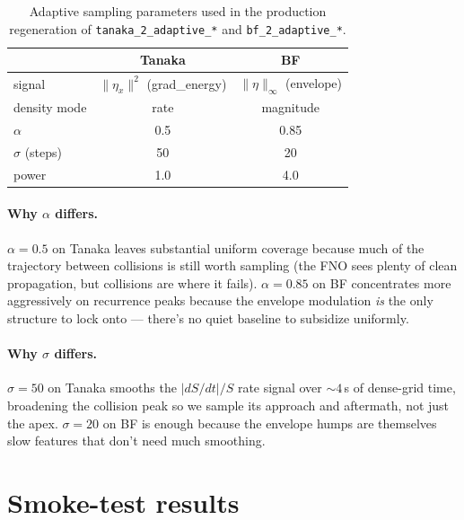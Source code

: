 \documentclass[11pt]{article}
\begin{document}
\begin{table}[h]
\centering
\begin{tabular}{lcc}
\toprule
                  & Tanaka                      & BF                          \\
\midrule
signal            & $\|\eta_x\|^2$ (grad\_energy) & $\|\eta\|_{\infty}$ (envelope) \\
density mode      & rate                        & magnitude                   \\
$\alpha$          & 0.5                         & 0.85                        \\
$\sigma$ (steps)  & 50                          & 20                          \\
power             & 1.0                         & 4.0                         \\
\bottomrule
\end{tabular}
\caption{Adaptive sampling parameters used in the production regeneration of
\texttt{tanaka\_2\_adaptive\_*} and \texttt{bf\_2\_adaptive\_*}.}
\end{table}

\paragraph{Why $\alpha$ differs.} $\alpha = 0.5$ on Tanaka leaves substantial
uniform coverage because much of the trajectory between collisions is still
worth sampling (the FNO sees plenty of clean propagation, but collisions are
where it fails). $\alpha = 0.85$ on BF concentrates more aggressively on
recurrence peaks because the envelope modulation \emph{is} the only structure
to lock onto --- there's no quiet baseline to subsidize uniformly.

\paragraph{Why $\sigma$ differs.} $\sigma = 50$ on Tanaka smooths the
$|dS/dt|/S$ rate signal over $\sim 4$\,s of dense-grid time, broadening the
collision peak so we sample its approach and aftermath, not just the apex.
$\sigma = 20$ on BF is enough because the envelope humps are themselves slow
features that don't need much smoothing.

\section{Smoke-test results}
\end{document}

